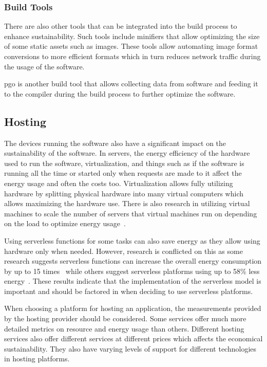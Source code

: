 \subsubsection{Build Tools}
There are also other tools that can be integrated into the build process to enhance sustainability. Such tools include minifiers that allow optimizing the size of some static assets such as images. These tools allow automating image format conversions to more efficient formats which in turn reduces network traffic during the usage of the software.

\gls{pgo} is another build tool that allows collecting data from software and feeding it to the compiler during the build process to further optimize the software.

\subsection{Hosting}\label{hosting}
The devices running the software also have a significant impact on the sustainability of the software. In servers, the energy efficiency of the hardware used to run the software, virtualization, and things such as if the software is running all the time or started only when requests are made to it affect the energy usage and often the costs too. Virtualization allows fully utilizing hardware by splitting physical hardware into many virtual computers which allows maximizing the hardware use. There is also research in utilizing virtual machines to scale the number of servers that virtual machines run on depending on the load to optimize energy usage~\cite{virtualmachines}. 

Using serverless functions for some tasks can also save energy as they allow using hardware only when needed. However, research is conflicted on this as some research suggests serverless functions can increase the overall energy consumption by up to 15 times~\cite{serverless} while others suggest serverless platforms using up to 58\% less energy~\cite{serverless2}. These results indicate that the implementation of the serverless model is important and should be factored in when deciding to use serverless platforms.

When choosing a platform for hosting an application, the measurements provided by the hosting provider should be considered. Some services offer much more detailed metrics on resource and energy usage than others. Different hosting services also offer different services at different prices which affects the economical sustainability. They also have varying levels of support for different technologies in hosting platforms. 

